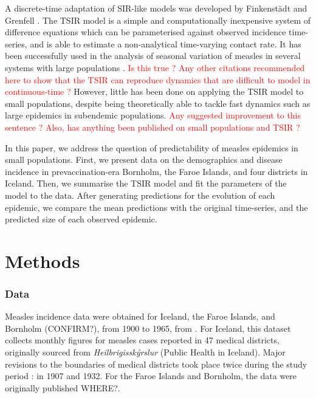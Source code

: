 \documentclass[10pt]{article}
\begin{document}
A discrete-time adaptation of SIR-like models was developed by Finkenst\"{a}dt and Grenfell \cite{Finkenstadt2000}. The TSIR model is a simple and computationally inexpensive system of difference equations which can be parameterised against observed incidence time-series, and is able to estimate a non-analytical time-varying contact rate. It has been successfully used in the analysis of seasonal variation of measles in several systems with large populations \cite{Bjornstad2002, Grenfell2002, Glass2003, Metcalf2010}. \textcolor{red}{Is this true ? Any other citations recommended here to show that the TSIR can reproduce dynamics that are difficult to model in continuous-time ?} However, little has been done on applying the TSIR model to small populations, despite being theoretically able to tackle fast dynamics such as large epidemics in subendemic populations. \textcolor{red}{Any suggested improvement to this sentence ? Also, has anything been published on small populations and TSIR ?}

In this paper, we address the question of predictability of measles epidemics in small populations. First, we present data on the demographics and disease incidence in prevaccination-era Bornholm, the Faroe Islands, and four districts in Iceland. Then, we summarise the TSIR model and fit the parameters of the model to the data. After generating predictions for the evolution of each epidemic, we compare the mean predictions with the original time-series, and the predicted size of each observed epidemic.














\section*{Methods}

\subsubsection*{Data}

Measles incidence data were obtained for Iceland, the Faroe Islands, and Bornholm (CONFIRM?), from 1900 to 1965, from \cite{Cliff1981}. For Iceland, this dataset collects monthly figures for measles cases reported in 47 medical districts, originally sourced from \textit{Heilbrig\dh{}issk\'{y}rslur} (Public Health in Iceland). Major revisions to the boundaries of medical districts took place twice during the study period : in 1907 and 1932. For the Faroe Islands and Bornholm, the data were originally published WHERE?. 
\end{document}
